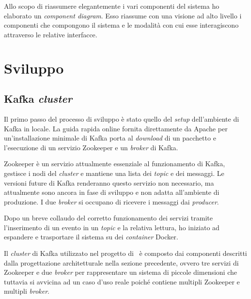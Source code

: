 Allo scopo di riassumere elegantemente i vari componenti del sistema ho elaborato un  \textit{component diagram}.
Esso riassume con una visione ad alto livello i componenti che compongono il sistema e le modalità con cui esse interagiscono attraverso le relative interfacce.






\section{Sviluppo}

\subsection{Kafka \textit{cluster}}

Il primo passo del processo di sviluppo è stato quello del \textit{setup} dell'ambiente di Kafka in locale.
La guida rapida online fornita direttamente da Apache per un'installazione minimale di Kafka porta al \textit{download} di un pacchetto e l'esecuzione di un servizio Zookeeper e un \textit{broker} di Kafka.

Zookeeper è un servizio attualmente essenziale al funzionamento di Kafka, gestisce i nodi del \textit{cluster} e mantiene una lista dei \textit{topic} e dei messaggi.
Le versioni future di Kafka renderanno questo servizio non necessario, ma attualmente sono ancora in fase di sviluppo e non adatta all'ambiente di produzione.
I due \textit{broker} si occupano di ricevere i messaggi dai \textit{producer}.

Dopo un breve collaudo del corretto funzionamento dei servizi tramite l'inserimento di un evento in un \textit{topic} e la relativa lettura, ho iniziato ad espandere e trasportare il sistema su dei \textit{container} Docker.

Il \textit{cluster} di Kafka utilizzato nel progetto di \stage\ è composto dai componenti descritti dalla progettazione architetturale nella sezione precedente, ovvero tre servizi di Zookeeper e due \textit{broker} per rappresentare un sistema di piccole dimensioni che tuttavia si avvicina ad un caso d'uso reale poiché contiene multipli Zookeeper e multipli \textit{broker}.

